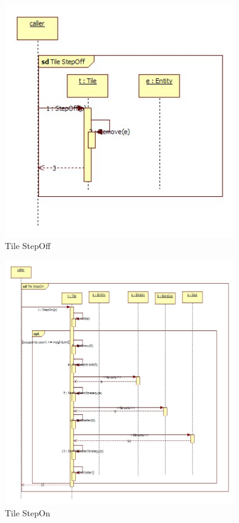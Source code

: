 \begin{figure}[H]
        \begin{center}
                \includegraphics[width=10cm]{chapters/chapter07/seqdiag/Tile_StepOff.jpg}
                \caption{Tile StepOff}
                \label{Tile StepOff}
        \end{center}
\end{figure}
\begin{figure}[H]
        \begin{center}
                \includegraphics[width=10cm]{chapters/chapter07/seqdiag/Tile_StepOn.jpg}
                \caption{Tile StepOn}
                \label{Tile StepOn}
        \end{center}
\end{figure}

